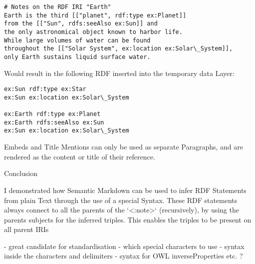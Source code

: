 \begin{verbatim}
# Notes on the RDF IRI "Earth"
Earth is the third [["planet", rdf:type ex:Planet]] 
from the [["Sun", rdfs:seeAlso ex:Sun]] and 
the only astronomical object known to harbor life.
While large volumes of water can be found 
throughout the [["Solar System", ex:location ex:Solar\_System]], 
only Earth sustains liquid surface water.
\end{verbatim}

Would result in the following RDF inserted into the temporary data Layer:

\begin{verbatim}
ex:Sun rdf:type ex:Star
ex:Sun ex:location ex:Solar\_System

ex:Earth rdf:type ex:Planet
ex:Earth rdfs:seeAlso ex:Sun
ex:Sun ex:location ex:Solar\_System
\end{verbatim}


Embeds and Title Mentions can only be used as separate Paragraphs, and are rendered as the content or title of their reference.

Conclusion

I demonstrated how Semantic Markdown can be used to infer RDF Statements from plain Text through the use of a special Syntax. These RDF statements always connect to all the parents of the `<:note>` (recursively), by using the parents subjects for the inferred triples. This enables the triples to be present on all parent IRIs

- great candidate for standardisation
    - which special characters to use
    - syntax inside the characters and delimiters
- syntax for OWL inverseProperties etc. ?